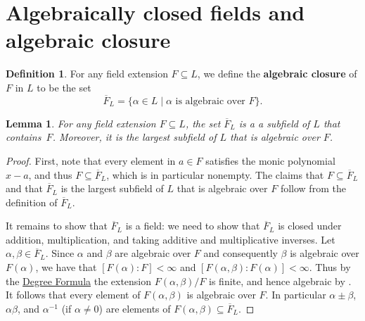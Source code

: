 \documentclass[12pt]{report}
\newtheorem{lemma}[theorem]{Lemma}
\numberwithin{equation}{section}
\numberwithin{theorem}{chapter}
\theoremstyle{definition}
\newtheorem{definition}[theorem]{Definition}
\newtheorem*{basic properties}{Basic Properties}
\newtheorem*{Important Remark}{Important Remark}
\newcommand{\df}[1]{{\bf #1}\index{#1}}
\begin{document}
\section{Algebraically closed fields and algebraic closure}



\begin{definition}
For any field extension $F \subseteq L$, we define the \df{algebraic closure} of $F$ in $L$ to be the set
$$\overline{F}_L= \{ \alpha \in L \mid \alpha \text{ is algebraic over } F \}.$$
\end{definition}


\begin{lemma} 
For any field extension $F \subseteq L$, the set $\overline{F}_L$ is a a subfield of $L$ that contains~$F$. Moreover, it is the largest subfield of $L$ that is algebraic over $F$.
\end{lemma}

\begin{proof}
First, note that every element in $a \in F$ satisfies the monic polynomial $x-a$, and thus $F \subseteq \overline{F}_L$, which is in particular nonempty. The claims that $F \subseteq \overline{F}_L$ and that $\overline{F}_L$ is the largest subfield of $L$ that is algebraic over $F$ follow from the definition of $\overline{F}_L$. 

It remains to show that $\overline{F}_L$ is a field: we need to show that $\overline{F}_L$ is closed under addition, multiplication, and taking additive and multiplicative inverses. Let $\alpha, \beta \in \overline{F}_L$. Since $\alpha$ and $\beta$ are algebraic over $F$ and consequently $\beta$ is algebraic over $F(\alpha)$, we have that $[F(\alpha):F]<\infty$ and $[F(\alpha,\beta):F(\alpha)]<\infty$. Thus by the \hyperref[deg formula]{Degree Formula} the extension $F(\alpha,\beta)/F$ is finite, and hence algebraic by . It follows that every element of $F(\alpha,\beta)$ is algebraic over $F$. In particular $\alpha\pm\beta$, $\alpha\beta$, and $\alpha^{-1}$ (if $\alpha \neq 0$) are elements of $F(\alpha,\beta) \subseteq \overline{F}_L$.
%
\end{proof}
\end{document}
